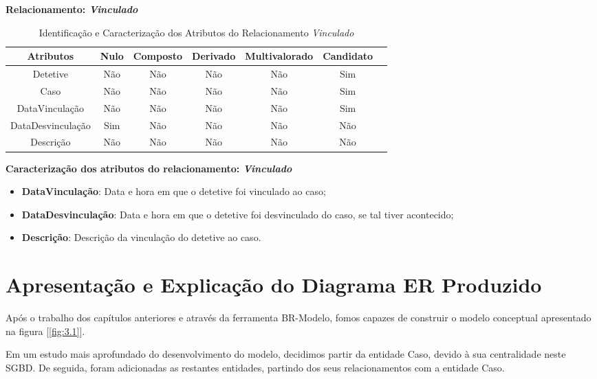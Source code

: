 \documentclass[a4paper,12pt]{scrreprt}
\newcommand{\Nao}{%
    \cellcolor{red!40}Não
}
\newcommand{\Sim}{%
    \cellcolor{green!40}Sim
}
\begin{document}
        \textbf{Relacionamento: \textit{Vinculado}}
        \begin{table}[!ht]
        \centering
        \begin{tabular}{|c|c|c|c|c|c|c|}
        \hline
        \rowcolor{gray!20!white}
        \textbf{Atributos} & \textbf{Nulo} & \textbf{Composto} & \textbf{Derivado} & \textbf{Multivalorado} & \textbf{Candidato} \\
        \hline
        Detetive          & \Nao & \Nao & \Nao & \Nao & \Sim \\
        Caso              & \Nao & \Nao & \Nao & \Nao & \Sim \\
        DataVinculação    & \Nao & \Nao & \Nao & \Nao & \Sim \\
        DataDesvinculação & \Sim & \Nao & \Nao & \Nao & \Nao \\  
        Descrição         & \Nao & \Nao & \Nao & \Nao & \Nao \\
        \hline
        \end{tabular}
        \caption{Identificação e Caracterização dos Atributos do Relacionamento \textit{Vinculado}}
        \end{table}

        \textbf{Caracterização dos atributos do relacionamento: \textit{Vinculado}}
        \begin{itemize}
            \item \textbf{DataVinculação}: Data e hora em que o detetive foi vinculado ao caso;
            \item \textbf{DataDesvinculação}: Data e hora em que o detetive foi desvinculado do caso, se tal tiver acontecido;
            \item \textbf{Descrição}: Descrição da vinculação do detetive ao caso.
        \end{itemize}


    \clearpage

    \section{Apresentação e Explicação do Diagrama ER Produzido}
        Após o trabalho dos capítulos anteriores e através da ferramenta BR-Modelo, fomos capazes de construir o modelo conceptual apresentado na figura [\ref{fig:3.1}].

        Em um estudo mais aprofundado do desenvolvimento do modelo, decidimos partir da entidade Caso, devido à sua centralidade neste SGBD.
        De seguida, foram adicionadas as restantes entidades, partindo dos seus relacionamentos com a entidade Caso.
\end{document}

